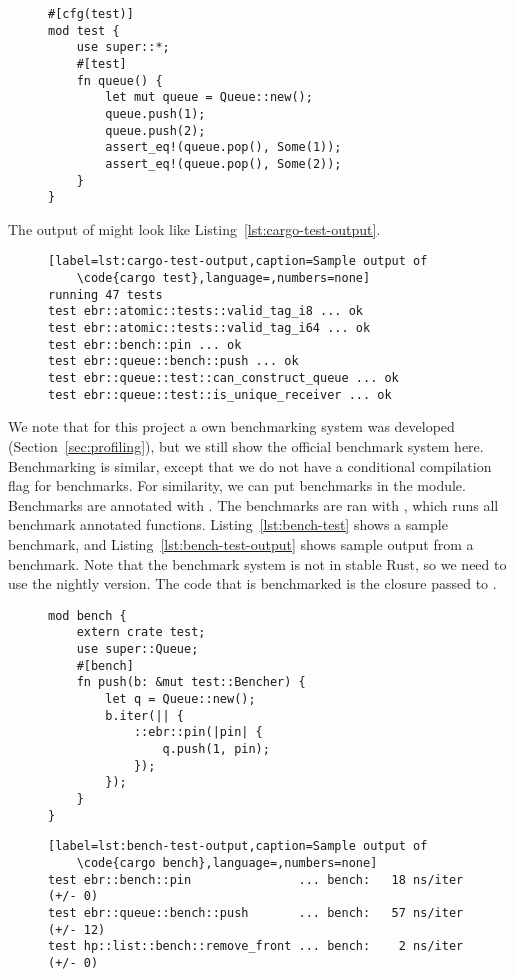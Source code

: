 \documentclass[b5paper]{report}
\begin{document}
\begin{appendices}
  \begin{figure}[ht]
  \begin{lstlisting}[label=lst:cargo-test,caption=An example test in Rust]
#[cfg(test)]
mod test {
    use super::*;
    #[test]
    fn queue() {
        let mut queue = Queue::new();
        queue.push(1);
        queue.push(2);
        assert_eq!(queue.pop(), Some(1));
        assert_eq!(queue.pop(), Some(2));
    }
}
    \end{lstlisting}
  \end{figure}
  The output of  might look like
  Listing~\ref{lst:cargo-test-output}.
  \begin{figure}[ht]
    \begin{lstlisting}[label=lst:cargo-test-output,caption=Sample output of
    \code{cargo test},language=,numbers=none]
running 47 tests
test ebr::atomic::tests::valid_tag_i8 ... ok
test ebr::atomic::tests::valid_tag_i64 ... ok
test ebr::bench::pin ... ok
test ebr::queue::bench::push ... ok
test ebr::queue::test::can_construct_queue ... ok
test ebr::queue::test::is_unique_receiver ... ok
    \end{lstlisting}
  \end{figure}

  We note that for this project a own benchmarking system was developed
  (Section~\ref{sec:profiling}), but we still show the official benchmark system here.
  Benchmarking is similar, except that we do not have a conditional compilation
  flag for benchmarks. For similarity, we can put benchmarks in the 
  module. Benchmarks are annotated with \code{\#[bench]}. The benchmarks are ran
  with , which runs all benchmark annotated functions.
  Listing~\ref{lst:bench-test} shows a sample benchmark, and
  Listing~\ref{lst:bench-test-output} shows sample output from a benchmark.
  Note that the benchmark system is not in stable Rust, so we need to use the
  nightly version. The code that is benchmarked is the closure passed to
  .

  \begin{figure}[ht]
  \begin{lstlisting}[label=lst:bench-test,caption=An example benchmark in Rust]
mod bench {
    extern crate test;
    use super::Queue;
    #[bench]
    fn push(b: &mut test::Bencher) {
        let q = Queue::new();
        b.iter(|| {
            ::ebr::pin(|pin| {
                q.push(1, pin);
            });
        });
    }
}
    \end{lstlisting}
  \end{figure}
  \begin{figure}[ht]
    \begin{lstlisting}[label=lst:bench-test-output,caption=Sample output of
    \code{cargo bench},language=,numbers=none]
test ebr::bench::pin               ... bench:   18 ns/iter (+/- 0)
test ebr::queue::bench::push       ... bench:   57 ns/iter (+/- 12)
test hp::list::bench::remove_front ... bench:    2 ns/iter (+/- 0)
    \end{lstlisting}
  \end{figure}



\end{appendices}
\end{document}
